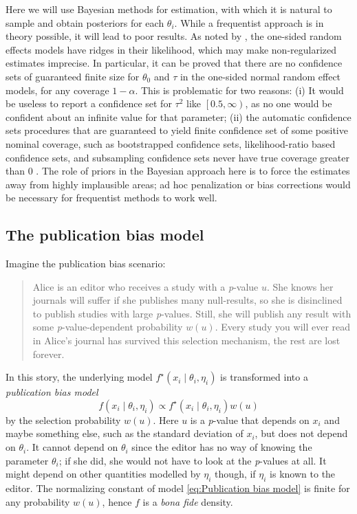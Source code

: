 \documentclass{article}
\theoremstyle{plain}
\theoremstyle{definition}
\begin{document}
Here we will use Bayesian methods for estimation, with which it is natural to sample and obtain posteriors for each $\theta_{i}$. While a frequentist approach is in theory possible, it will lead to poor results. As noted by \citet[Appendix, 1]{mcshane2016adjusting}, the one-sided random effects models have ridges in their likelihood, which may make non-regularized estimates imprecise. In particular, it can be proved \citep{Moss2019} that there are no confidence sets of guaranteed finite size for $\theta_{0}$ and $\tau$ in the one-sided normal random effect models, for any coverage $1-\alpha$. This is problematic for two reasons: (i) It would be useless to report a confidence set for $\tau^{2}$ like $\left[0.5,\infty\right)$, as no one would be confident about an infinite value for that parameter; (ii) the automatic confidence sets procedures that are guaranteed to yield finite confidence set of some positive nominal coverage, such as bootstrapped confidence sets, likelihood-ratio based confidence sets, and subsampling confidence sets never have true coverage greater than $0$ \citep[see][]{gleser996bootstrap, Moss2019}. The role of priors in the Bayesian approach here is to force the estimates away from highly implausible areas; ad hoc penalization or bias corrections would be necessary for frequentist methods to work well.

\subsection{The publication bias model} \label{subsect:publicationBias}

Imagine the publication bias scenario:
\begin{quote}
Alice is an editor who receives a study with a \textit{p}-value $u$. She knows her journals will suffer if she publishes many null-results, so she is disinclined to publish studies with large \textit{p}-values. Still, she will publish any result with some \textit{p}-value-dependent probability $w\left(u\right)$. Every study you will ever read in Alice's journal has survived this selection mechanism, the rest are lost forever.
\end{quote}
In this story, the underlying model $f^{\star}\left(x_{i}\mid\theta_{i},\eta_{i}\right)$
is transformed into a \emph{publication bias model}
\begin{equation}
f\left(x_{i}\mid\theta_{i},\eta_{i}\right)\propto f^{\star}\left(x_{i}\mid\theta_{i},\eta_{i}\right)w\left(u\right)\label{eq:Publication bias model}
\end{equation}
by the selection probability $w\left(u\right)$. Here $u$ is a \textit{p}-value that depends on $x_{i}$ and maybe something else, such as the standard deviation of $x_{i}$, but does not depend on $\theta_{i}$. It cannot depend on $\theta_{i}$ since the editor has no way of knowing the parameter $\theta_{i}$; if she did, she would not have to look at the \textit{p}-values at all. It might depend on other quantities modelled by $\eta_{i}$ though, if $\eta_{i}$ is known to the editor. The normalizing constant of model \eqref{eq:Publication bias model} is finite for any probability $w(u)$, hence $f$ is a \textit{bona fide} density.
\end{document}
